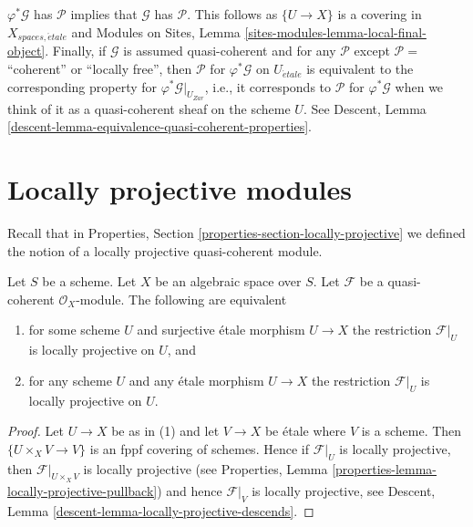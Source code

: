 $\varphi^*\mathcal{G}$ has $\mathcal{P}$ implies
that $\mathcal{G}$ has $\mathcal{P}$. This follows as $\{U \to X\}$
is a covering in $X_{spaces, \acute{e}tale}$ and
Modules on Sites, Lemma \ref{sites-modules-lemma-local-final-object}.
Finally, if $\mathcal{G}$ is assumed quasi-coherent and for any
$\mathcal{P}$ except $\mathcal{P}=$``coherent'' or ``locally free'',
then $\mathcal{P}$ for $\varphi^*\mathcal{G}$ on $U_{\acute{e}tale}$ is
equivalent to the corresponding property for
$\varphi^*\mathcal{G}|_{U_{Zar}}$, i.e., it corresponds to $\mathcal{P}$
for $\varphi^*\mathcal{G}$ when we think of it as a quasi-coherent sheaf
on the scheme $U$. See
Descent, Lemma \ref{descent-lemma-equivalence-quasi-coherent-properties}.



\section{Locally projective modules}
\label{section-locally-projective}

\noindent
Recall that in
Properties, Section \ref{properties-section-locally-projective}
we defined the notion of a locally projective
quasi-coherent module.

\begin{lemma}
\label{lemma-locally-projective}
Let $S$ be a scheme. Let $X$ be an algebraic space over $S$.
Let $\mathcal{F}$ be a quasi-coherent $\mathcal{O}_X$-module.
The following are equivalent
\begin{enumerate}
\item for some scheme $U$ and surjective \'etale morphism
$U \to X$ the restriction $\mathcal{F}|_U$ is locally projective
on $U$, and
\item for any scheme $U$ and any \'etale morphism
$U \to X$ the restriction $\mathcal{F}|_U$ is locally projective
on $U$.
\end{enumerate}
\end{lemma}

\begin{proof}
Let $U \to X$ be as in (1) and let $V \to X$ be \'etale where
$V$ is a scheme. Then $\{U \times_X V \to V\}$ is an fppf covering
of schemes. Hence if $\mathcal{F}|_U$ is locally projective, then
$\mathcal{F}|_{U \times_X V}$ is locally projective (see
Properties, Lemma \ref{properties-lemma-locally-projective-pullback})
and hence $\mathcal{F}|_V$ is locally projective, see
Descent, Lemma \ref{descent-lemma-locally-projective-descends}.
\end{proof}

